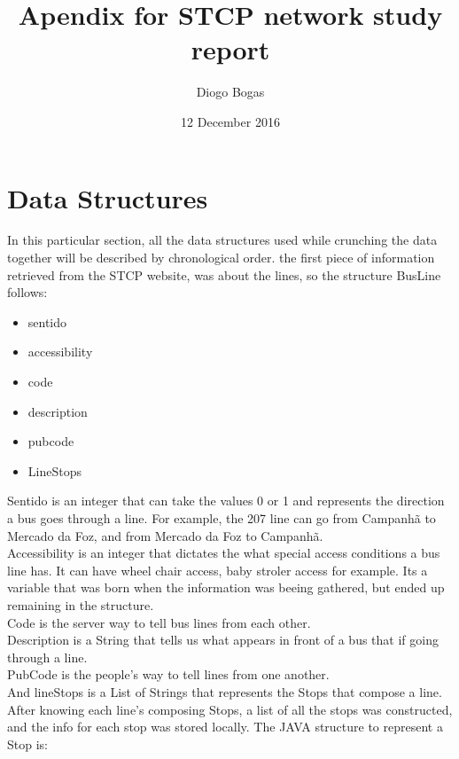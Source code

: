 \documentclass[12pt]{article}
\title{Apendix for STCP network study report}
\author{Diogo Bogas}
\date{12 December 2016}
\begin{document}
\maketitle

\section{Data Structures}

In this particular section, all the data structures used while crunching the data together will be described by chronological order.
the first piece of information retrieved from the STCP website, was about the lines, so the structure BusLine follows:
\begin{itemize}
\item sentido
\item accessibility
\item code
\item description
\item pubcode
\item LineStops
\end{itemize}
Sentido is an integer that can take the values 0 or 1 and represents the direction a bus goes through a line. For example, the 207 line can go from Campanhã to Mercado da Foz, and from Mercado da Foz to Campanhã.\\
Accessibility is an integer that dictates the what special access conditions a bus line has. It can have wheel chair access, baby stroler access for example. Its a variable that was born when the information was beeing gathered, but ended up remaining in the structure.\\
Code is the server way to tell bus lines from each other.\\
Description is a String that tells us what appears in front of a bus that if going through a line.\\
PubCode is the people's way to tell lines from one another.\\
And lineStops is a List of Strings that represents the Stops that compose a line.\\

After knowing each line's composing Stops, a list of all the stops was constructed, and the info for each stop was stored locally. The JAVA structure to represent a Stop is:
\end{document}
